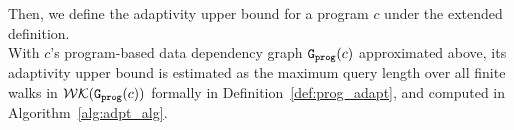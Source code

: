 Then, we define the adaptivity upper bound for a program $c$ under the extended definition.
\\
With
$c$'s program-based data dependency graph $\mathtt{{G_{prog}}}({c})$ approximated above,
%
its adaptivity upper bound 
%
is estimated as
the maximum query length over all finite walks in $\mathcal{WK}(\mathtt{{G_{prog}}}({c}))$ formally in Definition~\ref{def:prog_adapt}, 
and computed 
in Algorithm~\ref{alg:adpt_alg}.
%
%

